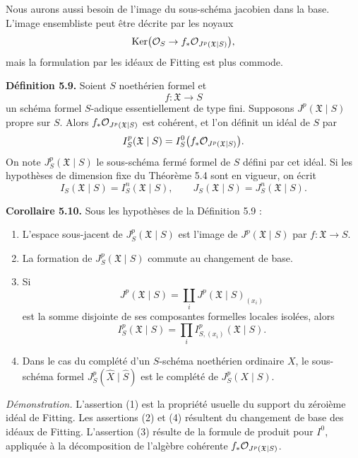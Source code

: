 \documentclass[11pt]{article}
\providecommand{\Ker}{\operatorname{Ker}}
\begin{document}
Nous aurons aussi besoin de l'image du sous-schéma jacobien dans la base.  L'image ensembliste peut être décrite par les noyaux
\[
        \Ker\bigl(\Oo_S\to f_*\Oo_{J^p(\mathfrak X\mid S)}\bigr),
\]
mais la formulation par les idéaux de Fitting est plus commode.

\textbf{Définition 5.9.}  Soient \(S\) noethérien formel et
\[
        f:\mathfrak X\longrightarrow S
\]
un schéma formel \(S\)-adique essentiellement de type fini.  Supposons \(J^p(\mathfrak X\mid S)\) propre sur \(S\).  Alors \(f_*\mathcal O_{J^p(\mathfrak X\mid S)}\) est cohérent, et l'on définit un idéal de \(S\) par
\[
        I^p_S(\mathfrak X\mid S)
        =
        I^0_S\bigl(f_*\mathcal O_{J^p(\mathfrak X\mid S)}\bigr).
\]
On note \(J^p_S(\mathfrak X\mid S)\) le sous-schéma fermé formel de \(S\) défini par cet idéal.  Si les hypothèses de dimension fixe du Théorème 5.4 sont en vigueur, on écrit
\[
        I_S(\mathfrak X\mid S)=I^n_S(\mathfrak X\mid S),
        \qquad
        J_S(\mathfrak X\mid S)=J^n_S(\mathfrak X\mid S).
\]

\textbf{Corollaire 5.10.}  Sous les hypothèses de la Définition 5.9 :
\begin{enumerate}[label=(\arabic*)]
\item L'espace sous-jacent de \(J^p_S(\mathfrak X\mid S)\) est l'image de \(J^p(\mathfrak X\mid S)\) par \(f:\mathfrak X\to S\).
\item La formation de \(J^p_S(\mathfrak X\mid S)\) commute au changement de base.
\item Si
\[
        J^p(\mathfrak X\mid S)=\coprod_i J^p(\mathfrak X\mid S)_{(x_i)}
\]
est la somme disjointe de ses composantes formelles locales isolées, alors
\[
        I^p_S(\mathfrak X\mid S)
        =
        \prod_i I^p_{S,(x_i)}(\mathfrak X\mid S).
\]
\item Dans le cas du complété d'un \(S\)-schéma noethérien ordinaire \(X\), le sous-schéma formel \(J^p_S(\widehat X\mid \widehat S)\) est le complété de \(J^p_S(X\mid S)\).
\end{enumerate}

\emph{Démonstration.}  L'assertion (1) est la propriété usuelle du support du zéroième idéal de Fitting.  Les assertions (2) et (4) résultent du changement de base des idéaux de Fitting.  L'assertion (3) résulte de la formule de produit pour \(I^0\), appliquée à la décomposition de l'algèbre cohérente \(f_*\mathcal O_{J^p(\mathfrak X\mid S)}\).
\end{document}
